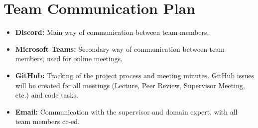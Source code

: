 \documentclass{article}
\begin{document}
  \section{Team Communication Plan}
\begin{itemize}
  \item \textbf{Discord:} Main way of communication between team members.
  \item \textbf{Microsoft Teams:} Secondary way of communication between team members, used for online meetings.
  \item \textbf{GitHub:} Tracking of the project process and meeting minutes. GitHub issues will be created for all meetings (Lecture, Peer Review, Supervisor Meeting, etc.) and code tasks.
  \item \textbf{Email:} Communication with the supervisor and domain expert, with all team members cc-ed.
\end{itemize}
\end{document}
